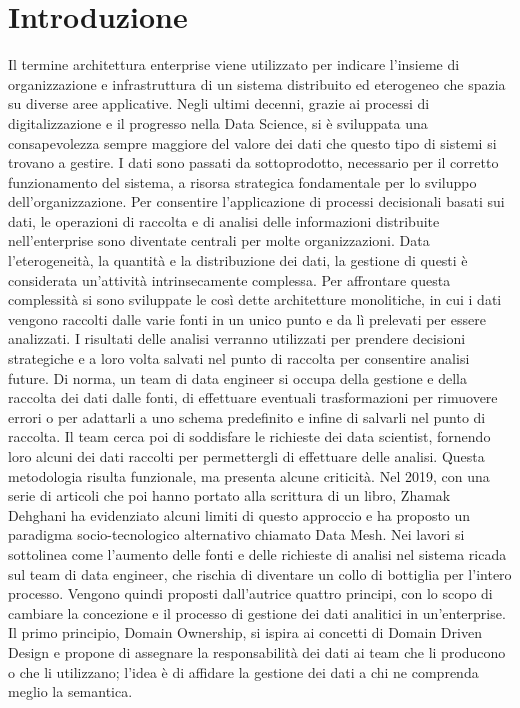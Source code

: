 \documentclass[12pt]{report}
\begin{document}
\chapter*{Introduzione}
Il termine architettura enterprise viene utilizzato per indicare l'insieme di organizzazione e infrastruttura di un sistema distribuito ed eterogeneo che spazia su diverse aree applicative.
Negli ultimi decenni, grazie ai processi di digitalizzazione e il progresso nella Data Science, si è sviluppata una consapevolezza sempre maggiore del valore dei dati che questo tipo di sistemi si trovano a gestire.
I dati sono passati da sottoprodotto, necessario per il corretto funzionamento del sistema, a risorsa strategica fondamentale per lo sviluppo dell'organizzazione.
Per consentire l'applicazione di processi decisionali basati sui dati, le operazioni di raccolta e di analisi delle informazioni distribuite nell'enterprise sono diventate centrali per molte organizzazioni.
Data l'eterogeneità, la quantità e la distribuzione dei dati, la gestione di questi è considerata un'attività intrinsecamente complessa.
Per affrontare questa complessità si sono sviluppate le così dette architetture monolitiche, in cui i dati vengono raccolti dalle varie fonti in un unico punto e da lì prelevati per essere analizzati.
I risultati delle analisi verranno utilizzati per prendere decisioni strategiche e a loro volta salvati nel punto di raccolta per consentire analisi future.
Di norma, un team di data engineer si occupa della gestione e della raccolta dei dati dalle fonti, di effettuare eventuali trasformazioni per rimuovere errori o per adattarli a uno schema predefinito e infine di salvarli nel punto di raccolta.
Il team cerca poi di soddisfare le richieste dei data scientist, fornendo loro alcuni dei dati raccolti per permettergli di effettuare delle analisi.
Questa metodologia risulta funzionale, ma presenta alcune criticità.
Nel 2019, con una serie di articoli che poi hanno portato alla scrittura di un libro, Zhamak Dehghani ha evidenziato alcuni limiti di questo approccio e ha proposto un paradigma socio-tecnologico alternativo chiamato Data Mesh.
Nei lavori si sottolinea come l'aumento delle fonti e delle richieste di analisi nel sistema ricada sul team di data engineer, che rischia di diventare un collo di bottiglia per l'intero processo.
Vengono quindi proposti dall'autrice quattro principi, con lo scopo di cambiare la concezione e il processo di gestione dei dati analitici in un'enterprise. 
Il primo principio, Domain Ownership, si ispira ai concetti di Domain Driven Design e propone di assegnare la responsabilità dei dati ai team che li producono o che li utilizzano; l'idea è di affidare la gestione dei dati a chi ne comprenda meglio la semantica.
\end{document}
